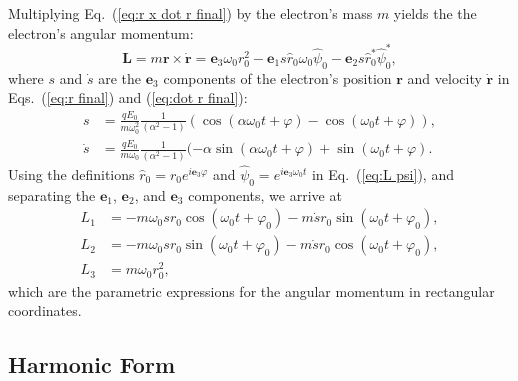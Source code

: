 \documentclass[twocolumn,showpacs,preprintnumbers,amsmath,amssymb]{revtex4}
\begin{document}
Multiplying Eq.~(\ref{eq:r x dot r final}) by the electron's mass $m$ yields the the electron's angular momentum:
\begin{equation}
\label{eq:L psi}
\mathbf L = m\mathbf r\times\dot{\mathbf r} = \mathbf e_3\omega_0r_0^2 - \mathbf e_1 s \hat r_0\omega_0\hat\psi_0 - \mathbf e_2 s \hat r_0^*\hat\psi_0^*,
\end{equation}
where $s$ and $\dot{s}$ are the $\mathbf e_3$ components of the electron's position $\mathbf r$ and velocity $\dot{\mathbf r}$ in Eqs.~(\ref{eq:r final}) and (\ref{eq:dot r final}):
\begin{subequations}
\begin{align}
\label{eq:s final}
s &= \frac{qE_0}{m\omega_0^2}\frac{1}{(\alpha^2 - 1)}(\cos(\alpha\omega_0 t +\varphi) - \cos(\omega_0t +\varphi)),\\
\label{eq:dot s final}
\dot{s} &= \frac{qE_0}{m\omega_0}\frac{1}{(\alpha^2 - 1)}(-\alpha\sin(\alpha\omega_0 t + \varphi) + \sin(\omega_0 t + \varphi).
\end{align}
\end{subequations}
Using the definitions $\hat r_0 = r_0e^{ i \mathbf e_3 \varphi}$ and $\hat\psi_0 = e^{ i \mathbf e_3 \omega_0 t}$ in Eq.~(\ref{eq:L psi}), and separating the $\mathbf e_1$, $\mathbf e_2$, and $\mathbf e_3$ components, we arrive at
\begin{subequations}
\begin{align}
L_1 &= -m\omega_0 s r_0\cos(\omega_0 t + \varphi_0) - m\dot{s} r_0\sin(\omega_0 t + \varphi_0),\\
L_2 &= -m\omega_0 s r_0\sin(\omega_0 t + \varphi_0) - m\dot{s} r_0\cos(\omega_0 t + \varphi_0),\\
L_3 &= m\omega_0r_0^2,
\end{align}
\end{subequations}
which are the parametric expressions for the angular momentum in rectangular coordinates.

\subsection{Harmonic Form}
\end{document}
